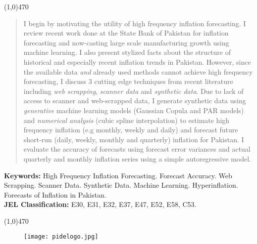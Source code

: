 \documentclass[12pt]{article}
\newcommand{\1}{\mathbbm 1}
\begin{document}
		\begin{center}
			\line(1,0){470}
		\end{center}
		\begin{spacing}{1.1}
			\vspace{-3ex}
			\begin{abstract}
				\noindent 
				I begin by motivating the utility of high frequency inflation forecasting. I review recent work done at the State Bank of Pakistan for inflation forecasting and now-casting large scale manufacturing growth using machine learning. I also present stylized facts about the structure of historical and especially recent inflation trends in Pakistan. However, since the available data \textit{and} already used methods cannot achieve high frequency forecasting, I discuss $3$ cutting edge techniques from recent literature including \textit{web scrapping}, \textit{scanner data} and \textit{synthetic data}. Due to lack of access to scanner and web-scrapped data, I generate synthetic data using \textit{generative} machine learning models (Gaussian Copula and PAR models) and \textit{numerical analysis} (cubic spline interpolation) to estimate high frequency inflation (e.g monthly, weekly and daily) and forecast future short-run (daily, weekly, monthly and quarterly) inflation for Pakistan. I evaluate the accuracy of forecasts using forecast error variances and actual quarterly and monthly inflation series using a simple autoregressive model.
				
			\end{abstract}
		\end{spacing}
		\textbf{Keywords:} High Frequency Inflation Forecasting. Forecast Accuracy. Web Scrapping. Scanner Data. Synthetic Data. Machine Learning. Hyperinflation. Forecasts of Inflation in Pakistan. {}\\
		\textbf{JEL Classification:} E30, E31, E32, E37, E47, E52, E58, C53.
		\\
		\begin{center}
			\vspace{-8ex}
			\line(1,0){470}
		\end{center}
		\baselineskip=18pt 
		
		\newpage{}
		
		\begin{figure}[H]
			\begin{center}
				\texttt{[image: pidelogo.jpg]}		
				\caption*{}
			\end{center}
		\end{figure}
		
\end{document}
